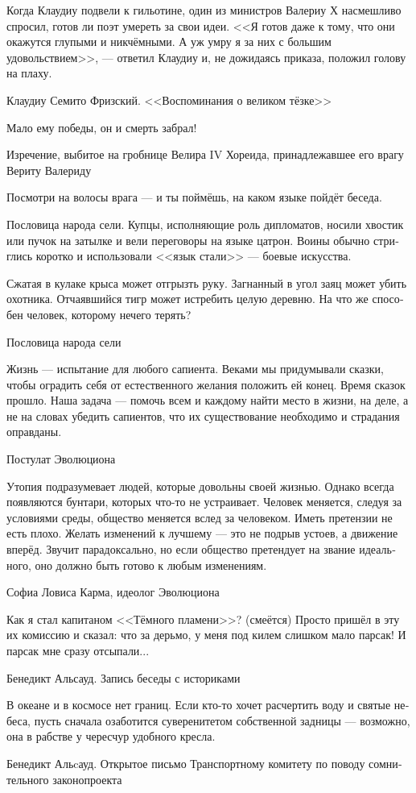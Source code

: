 \documentclass[a4paper,12pt,fleqn]{book}\usepackage{cooltooltips}\usepackage{polyglossia}\setdefaultlanguage[babelshorthands=true]{russian}\setotherlanguage{english}\defaultfontfeatures{Ligatures=TeX,Mapping=tex-text} \usepackage{xcolor}\definecolor{lightgray}{HTML}{bbbbbb}\color{lightgray}\newcommand{\ml}[3]{\textenglish{\textcolor{black}{#3}}}
\begin{document}
{\epigraph
{Когда Клаудиу подвели к гильотине, один из министров Валериу Х насмешливо спросил, готов ли поэт умереть за свои идеи.
<<Я готов даже к тому, что они окажутся глупыми и никчёмными.
А уж умру я за них с большим удовольствием>>, --- ответил Клаудиу и, не дожидаясь приказа, положил голову на плаху.}
{Клаудиу Семито Фризский. 
<<Воспоминания о великом тёзке>>}

\epigraph
{Мало ему победы, он и смерть забрал!}
{Изречение, выбитое на гробнице Велира IV Хореида, принадлежавшее его врагу Вериту Валериду}

\epigraph
{Посмотри на волосы врага --- и ты поймёшь, на каком языке пойдёт беседа.}
{Пословица народа сели.
Купцы, исполняющие роль дипломатов, носили хвостик или пучок на затылке и вели переговоры на языке цатрон.
Воины обычно стриглись коротко и использовали <<язык стали>> --- боевые искусства.}

\epigraph
{Сжатая в кулаке крыса может отгрызть руку.
Загнанный в угол заяц может убить охотника.
Отчаявшийся тигр может истребить целую деревню.
На что же способен человек, которому нечего терять?}
{Пословица народа сели}

\epigraph
{Жизнь --- испытание для любого сапиента.
Веками мы придумывали сказки, чтобы оградить себя от естественного желания положить ей конец.
Время сказок прошло.
Наша задача --- помочь всем и каждому найти место в жизни, на деле, а не на словах убедить сапиентов, что их существование необходимо и страдания оправданы.}
{Постулат Эволюциона}

\epigraph
{Утопия подразумевает людей, которые довольны своей жизнью.
Однако всегда появляются бунтари, которых что-то не устраивает.
Человек меняется, следуя за условиями среды, общество меняется вслед за человеком.
Иметь претензии не есть плохо.
Желать изменений к лучшему --- это не подрыв устоев, а движение вперёд.
Звучит парадоксально, но если общество претендует на звание идеального, оно должно быть готово к любым изменениям.}
{Софиа Ловиса Карма, идеолог Эволюциона}

\epigraph
{Как я стал капитаном <<Тёмного пламени>>?
(смеётся) Просто пришёл в эту их комиссию и сказал: что за дерьмо, у меня под килем слишком мало парсак!
И парсак мне сразу отсыпали...}
{Бенедикт Альсауд.
Запись беседы с историками}

\epigraph
{В океане и в космосе нет границ.
Если кто-то хочет расчертить воду и святые небеса, пусть сначала озаботится суверенитетом собственной задницы --- возможно, она в рабстве у чересчур удобного кресла.}
{Бенедикт Альcауд.
Открытое письмо Транспортному комитету по поводу сомнительного законопроекта}

}
\end{document}
